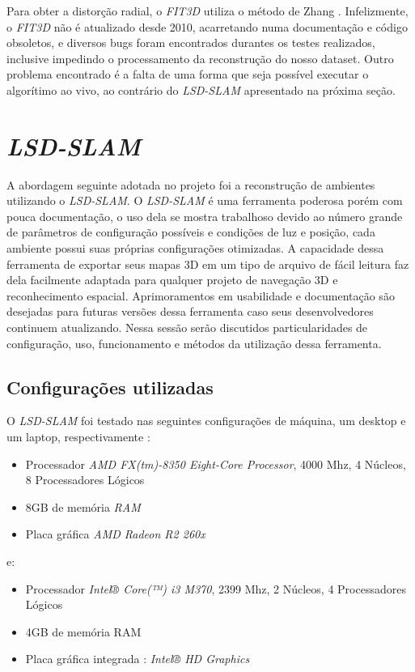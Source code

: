 Para obter a distorção radial, o \textit{FIT3D} utiliza o método de Zhang \cite{FIT3D}. Infelizmente, o \textit{FIT3D} não é atualizado desde 2010, acarretando numa documentação e código obsoletos, e diversos bugs foram encontrados durantes os testes realizados, inclusive impedindo o processamento da reconstrução do nosso dataset. Outro problema encontrado é a falta de uma forma que seja possível executar o algorítimo ao vivo, ao contrário do \textit{LSD-SLAM} apresentado na próxima seção.


\section{\textit{LSD-SLAM}}

A abordagem seguinte adotada no projeto foi a reconstrução de ambientes utilizando o \textit{LSD-SLAM}. O \textit{LSD-SLAM} é uma ferramenta poderosa porém com pouca documentação, o uso dela se mostra trabalhoso devido ao número grande de parâmetros de configuração possíveis e condições de luz e posição, cada ambiente possui suas próprias configurações otimizadas. A capacidade dessa ferramenta de exportar seus mapas 3D em um tipo de arquivo de fácil leitura faz dela facilmente adaptada para qualquer projeto de navegação 3D e reconhecimento espacial. Aprimoramentos em usabilidade e documentação são desejadas para futuras versões dessa ferramenta caso seus desenvolvedores continuem atualizando. Nessa sessão serão discutidos particularidades de configuração, uso, funcionamento e métodos da utilização dessa ferramenta.

\subsection{Configurações utilizadas}

O \textit{LSD-SLAM} foi testado nas seguintes configurações de máquina, um desktop e um laptop, respectivamente :

\begin{itemize}
	\item{Processador	\textit{AMD FX(tm)-8350 Eight-Core Processor}, 4000 Mhz, 4 Núcleos, 8 Processadores Lógicos}
	\item{8GB de memória \textit{RAM}}
	\item{Placa gráfica \textit{AMD Radeon R2 260x}}
\end{itemize}

e:

\begin{itemize}
	\item{Processador \textit{Intel® Core(™) i3 M370}, 2399 Mhz, 2 Núcleos, 4 Processadores Lógicos}
	\item{4GB de memória RAM}
	\item{Placa gráfica integrada : \textit{Intel® HD Graphics}}
\end{itemize}	

